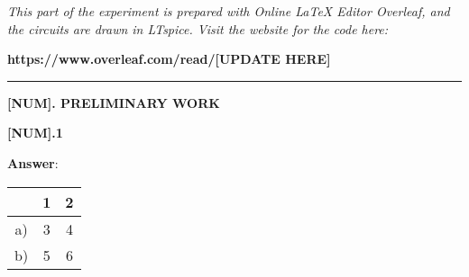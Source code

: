 \documentclass{article}
\begin{document}
\large %

{\textit{This part of the experiment is prepared with Online LaTeX Editor Overleaf, and the circuits are drawn in LTspice. Visit the website for the code here:}} %

{\textbf{https://www.overleaf.com/read/[UPDATE HERE]}} %
\vspace{4mm}
\hrule
\vspace{4mm}
{\Large \textbf{[NUM]. PRELIMINARY WORK}} %

\vspace{4mm} %



{\textbf{[NUM].1} \lipsum[1]} %

\vspace{4mm} %

{\textbf{Answer}: \lipsum[2]} %








\begin{center}
    \large
    \begin{tabular}{ |c| c c| } 
    \hline
          & 1 & 2\\
        \hline
        a)& 3 & 4 \\
        \hline
        b)& 5 & 6 \\
        \hline
    \end{tabular}
\end{center} %
\end{document}

